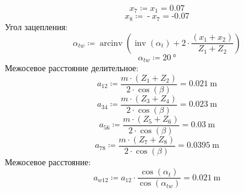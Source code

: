 \documentclass{article}
\newcommand{\defeq}{\coloneq} %
\begin{document}
\begin{equation*}
\textit{x}_{\textit{7}} \defeq \textit{x}_{\textit{1}} = {0.07}
\end{equation*}
\begin{equation*}
\textit{x}_{\textit{8}} \defeq  \operatorname{-} \textit{x}_{\textit{7}} = { \operatorname{-} 0.07}
\end{equation*}
\colorbox[HTML]{000000}{Угол зацепления:}\newline
\begin{equation*}
α_{tw} \defeq \operatorname{arcinv} \left( \operatorname{inv} \left( α_{t} \right)+2 \cdot \frac{\left( \textit{x}_{\textit{1}}+\textit{x}_{\textit{2}} \right)}{\textit{Z}_{\textit{1}}+\textit{Z}_{\textit{2}}} \right)
\end{equation*}
\begin{equation*}
α_{tw} \defeq 20 \: \mathrm{°}
\end{equation*}
\colorbox[HTML]{000000}{Межосевое расстояние делительное:}\newline
\begin{equation*}
\textit{a}_{\textit{12}} \defeq \frac{m \cdot \left( \textit{Z}_{\textit{1}}+\textit{Z}_{\textit{2}} \right)}{2 \cdot \cos \left( {\beta} \right)} = {0.021 \: \mathrm{m}}
\end{equation*}
\begin{equation*}
\textit{a}_{\textit{34}} \defeq \frac{m \cdot \left( \textit{Z}_{\textit{3}}+\textit{Z}_{\textit{4}} \right)}{2 \cdot \cos \left( {\beta} \right)} = {0.023 \: \mathrm{m}}
\end{equation*}
\begin{equation*}
\textit{a}_{\textit{56}} \defeq \frac{m \cdot \left( \textit{Z}_{\textit{5}}+\textit{Z}_{\textit{6}} \right)}{2 \cdot \cos \left( {\beta} \right)} = {0.03 \: \mathrm{m}}
\end{equation*}
\begin{equation*}
\textit{a}_{\textit{78}} \defeq \frac{m \cdot \left( \textit{Z}_{\textit{7}}+\textit{Z}_{\textit{8}} \right)}{2 \cdot \cos \left( {\beta} \right)} = {0.0395 \: \mathrm{m}}
\end{equation*}
\colorbox[HTML]{000000}{Межосевое расстояние:}\newline
\begin{equation*}
\textit{a}_{\textit{w12}} \defeq \textit{a}_{\textit{12}} \cdot \frac{\cos \left( α_{t} \right)}{\cos \left( α_{tw} \right)} = {0.021 \: \mathrm{m}}
\end{equation*}
\end{document}
